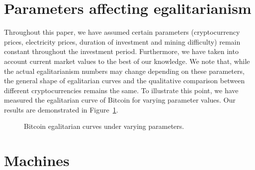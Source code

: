 \section{Parameters affecting egalitarianism}\label{sec:appendix-qualitative-difference}

Throughout this paper, we have assumed certain parameters (cryptocurrency
prices, electricity prices, duration of investment and mining difficulty) remain
constant throughout the investment period. Furthermore, we have taken into account
current market values to the best of our knowledge. We note that, while the
actual egalitarianism numbers may change depending on these parameters, the
general shape of egalitarian curves and the qualitative comparison between
different cryptocurrencies remains the same. To illustrate this point, we have
measured the egalitarian curve of Bitcoin for varying parameter values. Our
results are demonstrated in Figure~\ref{fig:different-settings}.

\begin{figure}
  \caption{Bitcoin egalitarian curves under varying parameters.}
  \label{fig:different-settings}
\end{figure}

\section{Machines}\label{sec:appendix-data}

